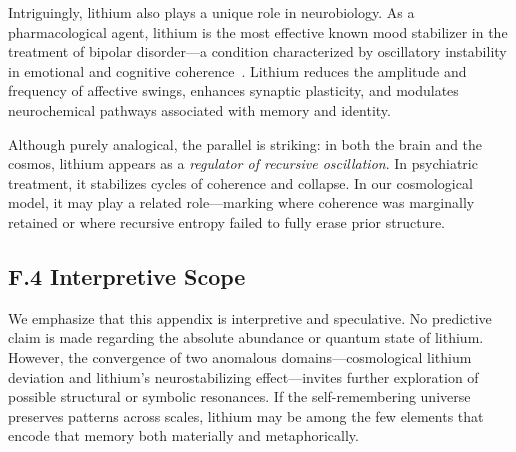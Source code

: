 Intriguingly, lithium also plays a unique role in neurobiology. As a pharmacological agent, lithium is the most effective known mood stabilizer in the treatment of bipolar disorder—a condition characterized by oscillatory instability in emotional and cognitive coherence~\cite{malhi2017lithium}. Lithium reduces the amplitude and frequency of affective swings, enhances synaptic plasticity, and modulates neurochemical pathways associated with memory and identity.

Although purely analogical, the parallel is striking: in both the brain and the cosmos, lithium appears as a \textit{regulator of recursive oscillation}. In psychiatric treatment, it stabilizes cycles of coherence and collapse. In our cosmological model, it may play a related role—marking where coherence was marginally retained or where recursive entropy failed to fully erase prior structure.

\subsection*{F.4 Interpretive Scope}

We emphasize that this appendix is interpretive and speculative. No predictive claim is made regarding the absolute abundance or quantum state of lithium. However, the convergence of two anomalous domains—cosmological lithium deviation and lithium's neurostabilizing effect—invites further exploration of possible structural or symbolic resonances. If the self-remembering universe preserves patterns across scales, lithium may be among the few elements that encode that memory both materially and metaphorically.
